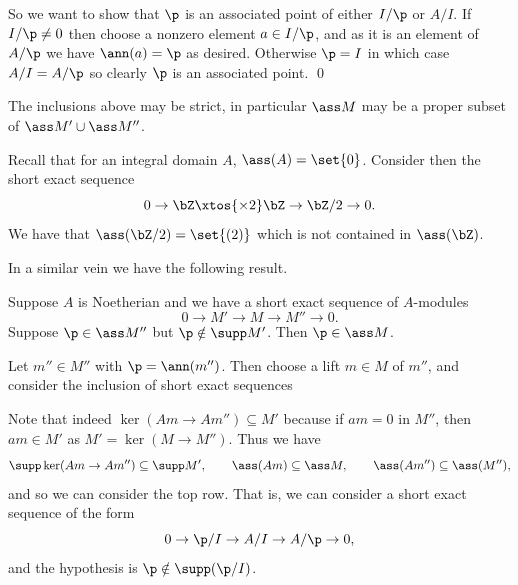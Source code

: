     So we want to show that $\p$ is an associated point of either $I/\p$ or $A/I$.
    If $I/\p\neq0$ then choose a nonzero element $a\in I/\p$, and as it is an element of $A/\p$ we have $\ann(a)=\p$ as desired.
    Otherwise $\p=I$ in which case $A/I=A/\p$ so clearly $\p$ is an associated point.
    \qed

\eproof

\bexam

    The inclusions above may be strict, in particular $\ass M$ may be a proper subset of $\ass M'\cup\ass M''$.

    Recall that for an integral domain $A$, $\ass(A)=\set{0}$.
    Consider then the short exact sequence
    $$ 0 \to \bZ \xtos{\times2}\bZ \to \bZ/2 \to 0 . $$
    We have that $\ass(\bZ/2)=\set{(2)}$ which is not contained in $\ass(\bZ)$.

\eexam

In a similar vein we have the following result.

\bprop[name={asssuppses}]

    Suppose $A$ is Noetherian and we have a short exact sequence of $A$-modules
    $$ 0 \to M' \to M \to M'' \to 0 . $$
    Suppose $\p\in\ass M''$ but $\p\notin\supp M'$.
    Then $\p\in\ass M$.

\eprop

\bproof

    Let $m''\in M''$ with $\p=\ann(m'')$.
    Then choose a lift $m\in M$ of $m''$, and consider the inclusion of short exact sequences


    Note that indeed $\ker(Am\to Am'')\subseteq M'$ because if $am=0$ in $M''$, then $am\in M'$ as $M'=\ker(M\to M'')$.
    Thus we have
    $$ \supp\ker(Am\to Am'') \subseteq \supp M',\qquad \ass(Am) \subseteq \ass M,\qquad \ass(Am'') \subseteq \ass(M'') , $$
    and so we can consider the top row.
    That is, we can consider a short exact sequence of the form
    $$ 0 \to \p/I \to A/I \to A/\p \to 0 , $$
    and the hypothesis is $\p\notin\supp(\p/I)$.


